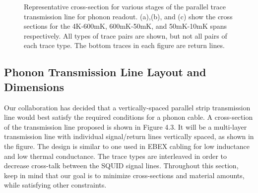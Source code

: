 \documentclass{report}
\begin{document}
\begin{figure}[h]
\begin{center}
\newline
{}\newline
{}
\caption{Representative cross-section for various stages of the parallel trace transmission line for phonon readout. (a),(b), and (c) show the cross sections for the 4K-600mK, 600mK-50mK, and 50mK-10mK spans respectively. All types of trace pairs are shown, but not all pairs of each trace type. The bottom traces in each figure are return lines.}
\end{center}
\end{figure}

\subsection{Phonon Transmission Line Layout and Dimensions}

Our collaboration has decided that a vertically-spaced parallel strip transmission line would best satisfy the required conditions for a phonon cable. A cross-section of the transmission line proposed is shown in Figure 4.3. It will be a multi-layer transmission line with individual signal/return lines vertically spaced, as shown in the figure. The design is similar to one used in EBEX cabling \cite{Polsgrove2009} for low inductance and low thermal conductance. The trace types are interleaved in order to decrease cross-talk between the SQUID signal lines. Throughout this section, keep in mind that our goal is to minimize cross-sections and material amounts, while satisfying other constraints.
\end{document}
